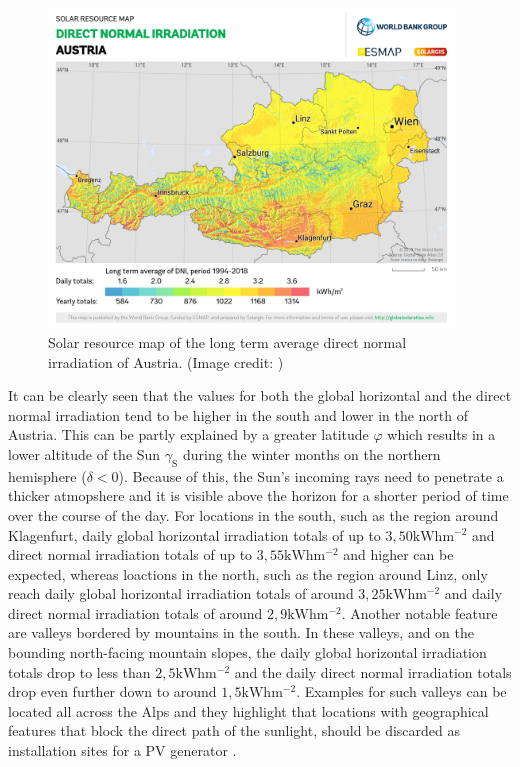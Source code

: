 \begin{figure}[h!]
	\centering
  	\includegraphics[width = 0.96\textwidth]{solar_maps/austria/austria_dni}
	\caption{Solar resource map of the long term average direct normal irradiation of Austria. (Image credit: \cite{GlobalSolarAtlas:2020, Solargis:2021})}
	\label{fig:dni_austria}
\end{figure}

It can be clearly seen that the values for both the global horizontal and the direct normal irradiation tend to be higher in the south and lower in the north of Austria. This can be partly explained by a greater latitude $\varphi$ which results in a lower altitude of the Sun $\gamma_{\mathrm{S}}$ during the winter months on the northern hemisphere ($\delta < 0$). Because of this, the Sun's incoming rays need to penetrate a thicker atmopshere and it is visible above the horizon for a shorter period of time over the course of the day. For locations in the south, such as the region around Klagenfurt, daily global horizontal irradiation totals of up to $3,50\mathrm{kWh}\mathrm{m}^{-2}$ and direct normal irradiation totals of up to $3,55\mathrm{kWh}\mathrm{m}^{-2}$ and higher can be expected, whereas loactions in the north, such as the region around Linz, only reach daily global horizontal irradiation totals of around $3,25\mathrm{kWh}\mathrm{m}^{-2}$ and daily direct normal irradiation totals of around $2,9\mathrm{kWh}\mathrm{m}^{-2}$. Another notable feature are valleys bordered by mountains in the south. In these valleys, and on the bounding north-facing mountain slopes, the daily global horizontal irradiation totals drop to less than $2,5\mathrm{kWh}\mathrm{m}^{-2}$ and the daily direct normal irradiation totals drop even further down to around $1,5\mathrm{kWh}\mathrm{m}^{-2}$. Examples for such valleys can be located all across the Alps and they highlight that locations with geographical features that block the direct path of the sunlight, should be discarded as installation sites for a PV generator \cite{Karttunen:2006, Mertens:2015, Wagner:2018}.

